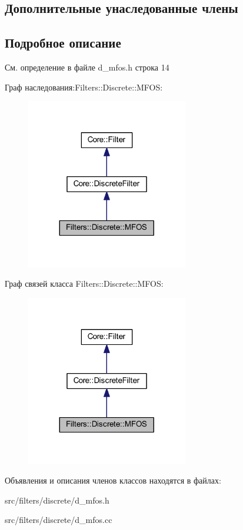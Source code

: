 \subsection*{Дополнительные унаследованные члены}


\subsection{Подробное описание}


См. определение в файле d\+\_\+mfos.\+h строка 14



Граф наследования\+:Filters\+:\+:Discrete\+:\+:M\+F\+OS\+:
\nopagebreak
\begin{figure}[H]
\begin{center}
\leavevmode
\includegraphics[width=200pt]{class_filters_1_1_discrete_1_1_m_f_o_s__inherit__graph}
\end{center}
\end{figure}


Граф связей класса Filters\+:\+:Discrete\+:\+:M\+F\+OS\+:
\nopagebreak
\begin{figure}[H]
\begin{center}
\leavevmode
\includegraphics[width=200pt]{class_filters_1_1_discrete_1_1_m_f_o_s__coll__graph}
\end{center}
\end{figure}


Объявления и описания членов классов находятся в файлах\+:\begin{DoxyCompactItemize}
\item 
src/filters/discrete/d\+\_\+mfos.\+h\item 
src/filters/discrete/d\+\_\+mfos.\+cc\end{DoxyCompactItemize}
